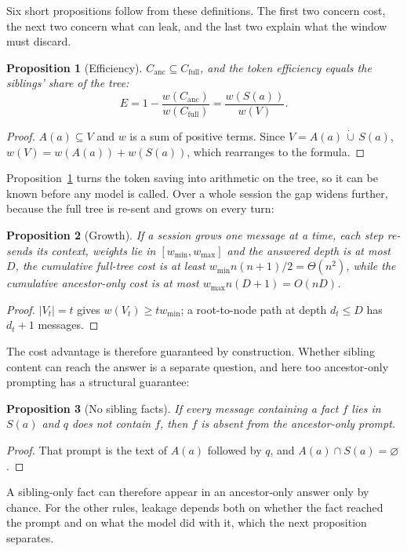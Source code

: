 \documentclass[conference]{IEEEtran}
\newtheorem{proposition}{Proposition}
\theoremstyle{definition}
\newcommand{\A}{A(a)}
\newcommand{\Sib}{S(a)}
\newcommand{\anc}{\mathrm{anc}}
\newcommand{\full}{\mathrm{full}}
\begin{document}
Six short propositions follow from these definitions. The first two concern cost, the next two concern what can leak, and the last two explain what the window must discard.

\begin{proposition}[Efficiency]\label{prop:eff}
$C_\anc\subseteq C_\full$, and the token efficiency equals the siblings' share of the tree:
\[E=1-\frac{w(C_\anc)}{w(C_\full)}=\frac{w(\Sib)}{w(V)}.\]
\end{proposition}
\begin{proof}
$\A\subseteq V$ and $w$ is a sum of positive terms. Since $V=\A\,\dot\cup\,\Sib$, $w(V)=w(\A)+w(\Sib)$, which rearranges to the formula.
\end{proof}

Proposition~\ref{prop:eff} turns the token saving into arithmetic on the tree, so it can be known before any model is called. Over a whole session the gap widens further, because the full tree is re-sent and grows on every turn:

\begin{proposition}[Growth]\label{prop:growth}
If a session grows one message at a time, each step re-sends its context, weights lie in $[w_{\min},w_{\max}]$ and the answered depth is at most $D$, the cumulative full-tree cost is at least $w_{\min}n(n+1)/2=\Theta(n^2)$, while the cumulative ancestor-only cost is at most $w_{\max}n(D+1)=O(nD)$.
\end{proposition}
\begin{proof}
$|V_t|=t$ gives $w(V_t)\ge tw_{\min}$; a root-to-node path at depth $d_t\le D$ has $d_t+1$ messages.
\end{proof}

The cost advantage is therefore guaranteed by construction. Whether sibling content can reach the answer is a separate question, and here too ancestor-only prompting has a structural guarantee:

\begin{proposition}[No sibling facts]\label{prop:nosib}
If every message containing a fact $f$ lies in $\Sib$ and $q$ does not contain $f$, then $f$ is absent from the ancestor-only prompt.
\end{proposition}
\begin{proof}
That prompt is the text of $\A$ followed by $q$, and $\A\cap\Sib=\varnothing$.
\end{proof}

A sibling-only fact can therefore appear in an ancestor-only answer only by chance. For the other rules, leakage depends both on whether the fact reached the prompt and on what the model did with it, which the next proposition separates.
\end{document}
